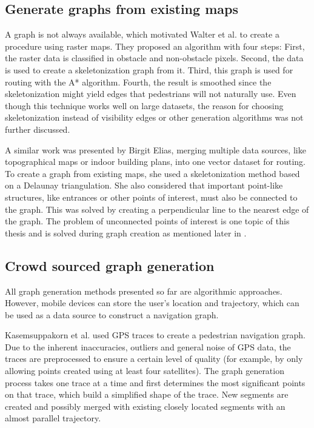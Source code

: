 	\subsection{Generate graphs from existing maps}
	\label{subsection:generate-graphs-from-maps}
	
		A graph is not always available, which motivated Walter et al. to create a procedure using raster maps\cite{walter-raster-maps}.
		They proposed an algorithm with four steps:
		First, the raster data is classified in obstacle and non-obstacle pixels.
		Second, the data is used to create a skeletonization graph from it.
		Third, this graph is used for routing with the A* algorithm.
		Fourth, the result is smoothed since the skeletonization might yield edges that pedestrians will not naturally use.
		Even though this technique works well on large datasets, the reason for choosing skeletonization instead of visibility edges or other generation algorithms was not further discussed.
		
		A similar work was presented by Birgit Elias, merging multiple data sources, like topographical maps or indoor building plans, into one vector dataset for routing\cite{elias-tailored-geodatabase}.
		To create a graph from existing maps, she used a skeletonization method based on a Delaunay triangulation.
		She also considered that important point-like structures, like entrances or other points of interest, must also be connected to the graph.
		This was solved by creating a perpendicular line to the nearest edge of the graph.
		The problem of unconnected points of interest is one topic of this thesis and is solved during graph creation as mentioned later in .
		
	\subsection{Crowd sourced graph generation}
	
		All graph generation methods presented so far are algorithmic approaches.
		However, mobile devices can store the user's location and trajectory, which can be used as a data source to construct a navigation graph.
		
		Kasemsuppakorn et al. used GPS traces to create a pedestrian navigation graph\cite{kasemsuppakorn-gps-traces-pedestrain-network}.
		Due to the inherent inaccuracies, outliers and general noise of GPS data, the traces are preprocessed to ensure a certain level of quality (for example, by only allowing points created using at least four satellites).
		The graph generation process takes one trace at a time and first determines the most significant points on that trace, which build a simplified shape of the trace.
		New segments are created and possibly merged with existing closely located segments with an almost parallel trajectory.
		
